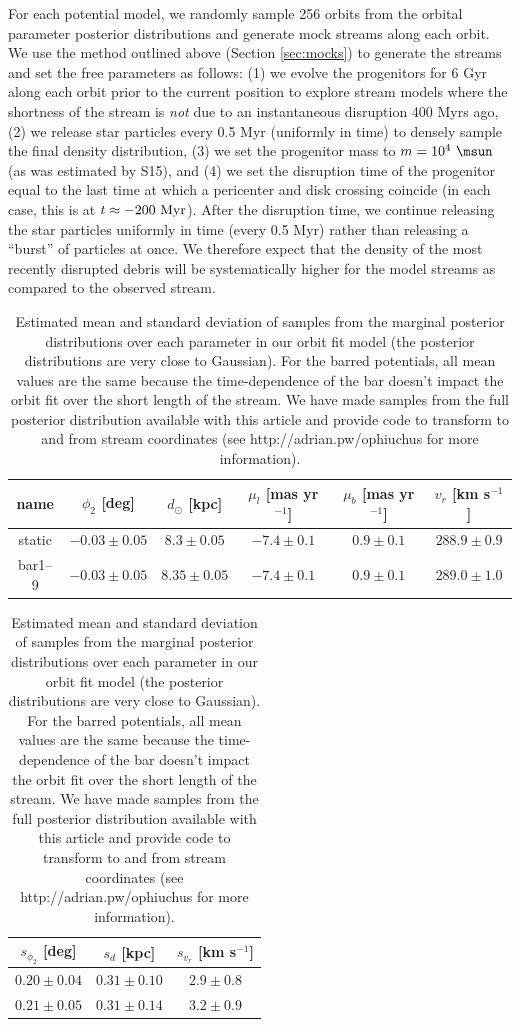 \documentclass[letterpaper,12pt,preprint]{aastex}
\begin{document}
For each potential model, we randomly sample 256 orbits from the orbital parameter posterior distributions and generate mock streams along each orbit. We use the method outlined above (Section \ref{sec:mocks}) to generate the streams and set the free parameters as follows: (1) we evolve the progenitors for 6 Gyr along each orbit prior to the current position to explore stream models where the shortness of the stream is \emph{not} due to an instantaneous disruption 400 Myrs ago, (2) we release star particles every 0.5 Myr (uniformly in time) to densely sample the final density distribution, (3) we set the progenitor mass to $m=10^4~\msun$ (as was estimated by S15), and (4) we set the disruption time of the progenitor equal to the last time at which a pericenter and disk crossing coincide (in each case, this is at $t \approx -200~{\rm Myr}$). After the disruption time, we continue releasing the star particles uniformly in time (every 0.5 Myr) rather than releasing a ``burst'' of particles at once. We therefore expect that the density of the most recently disrupted debris will be systematically higher for the model streams as compared to the observed stream.

\begin{table}[ht]
\footnotesize
\begin{center}
	\begin{tabular}{cccccc}
	\toprule
	name & $\phi_2$ [deg] & $d_\odot$ [kpc] & $\mu_l$ [mas yr$^{-1}$] & $\mu_b$ [mas yr$^{-1}$] & $v_r$ [km s$^{-1}$]\\\midrule
	static & $-0.03\pm0.05$ & $8.3\pm0.05$ & $-7.4\pm0.1$ & $0.9\pm0.1$ & $288.9\pm0.9$\\
	bar1--9 & $-0.03\pm0.05$ & $8.35\pm0.05$ & $-7.4\pm0.1$ & $0.9\pm0.1$ & $289.0\pm1.0$\\
	\bottomrule
	\end{tabular}

	\begin{tabular}{ccc}
	\toprule
	$s_{\phi_2}$ [deg] & $s_{d}$ [kpc] & $s_{v_r}$ [km s$^{-1}$]\\\midrule
	$0.20\pm0.04$ & $0.31\pm0.10$ & $2.9\pm0.8$\\
	$0.21\pm0.05$ & $0.31\pm0.14$ & $3.2\pm0.9$\\
	\bottomrule
	\end{tabular}
	\caption{Estimated mean and standard deviation of samples from the marginal posterior distributions over each parameter in our orbit fit model (the posterior distributions are very close to Gaussian). For the barred potentials, all mean values are the same because the time-dependence of the bar doesn't impact the orbit fit over the short length of the stream. We have made samples from the full posterior distribution available with this article and provide code to transform to and from stream coordinates (see http://adrian.pw/ophiuchus for more information).\label{tbl:param-means} }
\end{center}
\end{table}
\end{document}
